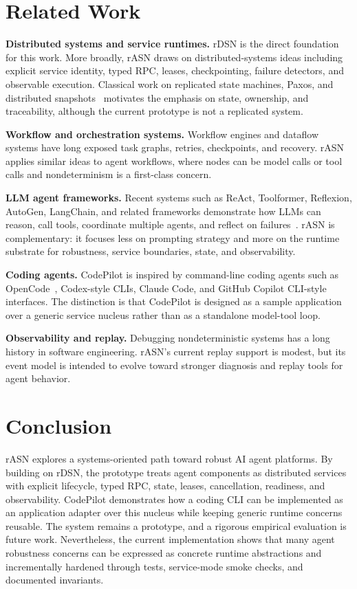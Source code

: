 \documentclass[manuscript,screen,review]{acmart}
\newcommand{\rasn}{rASN\xspace}
\newcommand{\rdsn}{rDSN\xspace}
\newcommand{\codepilot}{CodePilot\xspace}
\begin{document}
\section{Related Work}

\textbf{Distributed systems and service runtimes.} \rdsn is the direct
foundation for this work. More broadly, \rasn draws on distributed-systems
ideas including explicit service identity, typed RPC, leases, checkpointing,
failure detectors, and observable execution. Classical work on replicated state machines, Paxos, and distributed
snapshots~\cite{lamport1998parttime,chandy1985distributed} motivates the
emphasis on state, ownership, and traceability, although the current prototype
is not a replicated system.

\textbf{Workflow and orchestration systems.} Workflow engines and dataflow
systems have long exposed task graphs, retries, checkpoints, and recovery.
\rasn applies similar ideas to agent workflows, where nodes can be model calls
or tool calls and nondeterminism is a first-class concern.

\textbf{LLM agent frameworks.} Recent systems such as ReAct, Toolformer,
Reflexion, AutoGen, LangChain, and related frameworks demonstrate how LLMs can
reason, call tools, coordinate multiple agents, and reflect on
failures~\cite{yao2023react,schick2023toolformer,shinn2023reflexion,wu2023autogen,langchain}.
\rasn is complementary: it focuses less on prompting strategy and more on the
runtime substrate for robustness, service boundaries, state, and observability.

\textbf{Coding agents.} \codepilot is inspired by command-line coding agents
such as OpenCode~\cite{opencode}, Codex-style CLIs, Claude Code, and GitHub
Copilot CLI-style interfaces. The distinction is that \codepilot is designed
as a sample application over a generic service nucleus rather than as a
standalone model-tool loop.

\textbf{Observability and replay.} Debugging nondeterministic systems has a
long history in software engineering. \rasn's current replay support is modest,
but its event model is intended to evolve toward stronger diagnosis and replay
tools for agent behavior.

\section{Conclusion}

\rasn explores a systems-oriented path toward robust AI agent platforms. By
building on \rdsn, the prototype treats agent components as distributed
services with explicit lifecycle, typed RPC, state, leases, cancellation,
readiness, and observability. \codepilot demonstrates how a coding CLI can be
implemented as an application adapter over this nucleus while keeping generic
runtime concerns reusable. The system remains a prototype, and a rigorous
empirical evaluation is future work. Nevertheless, the current implementation
shows that many agent robustness concerns can be expressed as concrete runtime
abstractions and incrementally hardened through tests, service-mode smoke
checks, and documented invariants.



\end{document}
